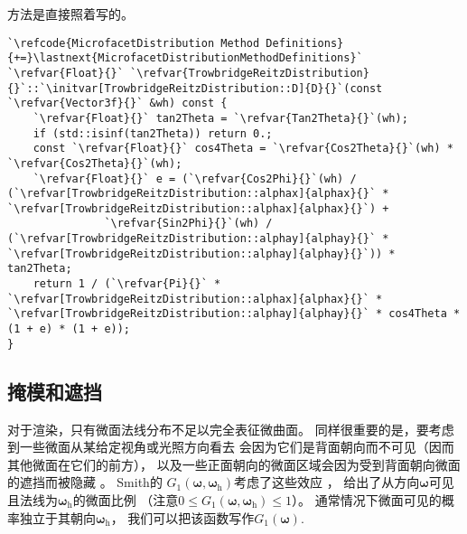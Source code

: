 方法是直接照着写的。
\begin{lstlisting}
`\refcode{MicrofacetDistribution Method Definitions}{+=}\lastnext{MicrofacetDistributionMethodDefinitions}`
`\refvar{Float}{}` `\refvar{TrowbridgeReitzDistribution}{}`::`\initvar[TrowbridgeReitzDistribution::D]{D}{}`(const `\refvar{Vector3f}{}` &wh) const {
    `\refvar{Float}{}` tan2Theta = `\refvar{Tan2Theta}{}`(wh);
    if (std::isinf(tan2Theta)) return 0.;
    const `\refvar{Float}{}` cos4Theta = `\refvar{Cos2Theta}{}`(wh) * `\refvar{Cos2Theta}{}`(wh);
    `\refvar{Float}{}` e = (`\refvar{Cos2Phi}{}`(wh) / (`\refvar[TrowbridgeReitzDistribution::alphax]{alphax}{}` * `\refvar[TrowbridgeReitzDistribution::alphax]{alphax}{}`) +
               `\refvar{Sin2Phi}{}`(wh) / (`\refvar[TrowbridgeReitzDistribution::alphay]{alphay}{}` * `\refvar[TrowbridgeReitzDistribution::alphay]{alphay}{}`)) * tan2Theta;
    return 1 / (`\refvar{Pi}{}` * `\refvar[TrowbridgeReitzDistribution::alphax]{alphax}{}` * `\refvar[TrowbridgeReitzDistribution::alphay]{alphay}{}` * cos4Theta * (1 + e) * (1 + e));
}
\end{lstlisting}

\subsection{掩模和遮挡}\label{sub:掩模和遮挡}
对于渲染，只有微面法线分布不足以完全表征微曲面。
同样很重要的是，要考虑到一些微面从某给定视角或光照方向看去
会因为它们是背面朝向而不可见（因而其他微面在它们的前方），
以及一些正面朝向的微面区域会因为受到背面朝向微面的遮挡而被隐藏
。
Smith的
$G_1({\bm\omega},{\bm\omega}_{\mathrm{h}})$考虑了这些效应
，
给出了从方向$\bm\omega$可见且法线为${\bm\omega}_{\mathrm{h}}$的微面比例
（注意$0\le G_1({\bm\omega},{\bm\omega}_{\mathrm{h}})\le 1$）。
通常情况下微面可见的概率独立于其朝向${\bm\omega}_{\mathrm{h}}$，
我们可以把该函数写作$G_1({\bm\omega})$.


